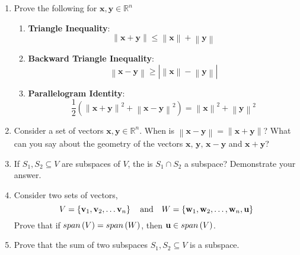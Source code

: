 \begin{enumerate}
    \item Prove the following for $\mathbf{x}, \mathbf{y} \in \mathbb{R}^n$
    \begin{enumerate}
        \item {\small \textbf{Triangle Inequality}}:
        $$\left\lVert \mathbf{x} + \mathbf{y}\right\rVert \leq \left\lVert \mathbf{x}\right\rVert + \left\lVert \mathbf{y}\right\rVert$$
        \item {\small \textbf{Backward Triangle Inequality}}:
        $$\left\lVert \mathbf{x} - \mathbf{y}\right\rVert  \geq \left\lvert \left\lVert \mathbf{x}\right\rVert - \left\lVert \mathbf{y}\right\rVert \right\rvert$$
        \item {\small \textbf{Parallelogram Identity}}:
        $$\frac{1}{2} \left(\left\lVert \mathbf{x} + \mathbf{y}\right\rVert^2 + \left\lVert \mathbf{x} - \mathbf{y}\right\rVert^2 \right) = \left\lVert \mathbf{x}\right\rVert^2 + \left\lVert \mathbf{y}\right\rVert^2$$
    \end{enumerate}

    \item Consider a set of vectors $\mathbf{x}, \mathbf{y} \in \mathbb{R}^n$. When is $\left\lVert \mathbf{x} - \mathbf{y} \right\rVert = \left\lVert \mathbf{x} + \mathbf{y}\right\rVert$? What can you say about the geometry of the vectors $\mathbf{x},\,\mathbf{y},\,\mathbf{x} - \mathbf{y}$ and $\mathbf{x} + \mathbf{y}$?
    
    \item If $S_1, S_2 \subseteq V$ are subspaces of $V$, the is $S_1 \cap S_2$ a subspace? Demonstrate your answer.

    \item Consider two sets of vectors,
    $$V = \left\{ \mathbf{v}_1, \mathbf{v}_2, \ldots \mathbf{v}_n\right\} \quad \text{and} \quad W = \left\{ \mathbf{w}_1, \mathbf{w}_2, \ldots, \mathbf{w}_n, \mathbf{u}\right\}$$
    Prove that if $span\left( V\right) = span\left( W\right)$, then $\mathbf{u} \in span\left( V\right)$.
    
    \item Prove that the sum of two subspaces $S_1, S_2 \subseteq V$ is a subspace.
    

\end{enumerate}
